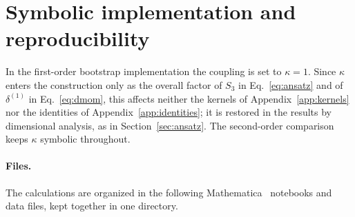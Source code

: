 \documentclass[prd,aps,preprint,superscriptaddress,nofootinbib,amsmath,amssymb,eqsecnum]{revtex4-2}
\begin{document}
\section{Symbolic implementation and reproducibility}
\label{app:implementation}

In the first-order bootstrap implementation the coupling is set to $\kappa=1$. Since
$\kappa$ enters the construction only as the overall factor of $S_3$ in Eq.~\eqref{eq:ansatz}
and of $\delta^{(1)}$ in Eq.~\eqref{eq:dmom}, this affects neither the kernels of
Appendix~\ref{app:kernels} nor the identities of Appendix~\ref{app:identities}; it is restored
in the results by dimensional analysis, as in Section~\ref{sec:ansatz}. The second-order
comparison keeps $\kappa$ symbolic throughout.

\paragraph{Files.} The calculations are organized in the following Mathematica~\cite{Mathematica}
notebooks and data files, kept together in one directory.
\end{document}
